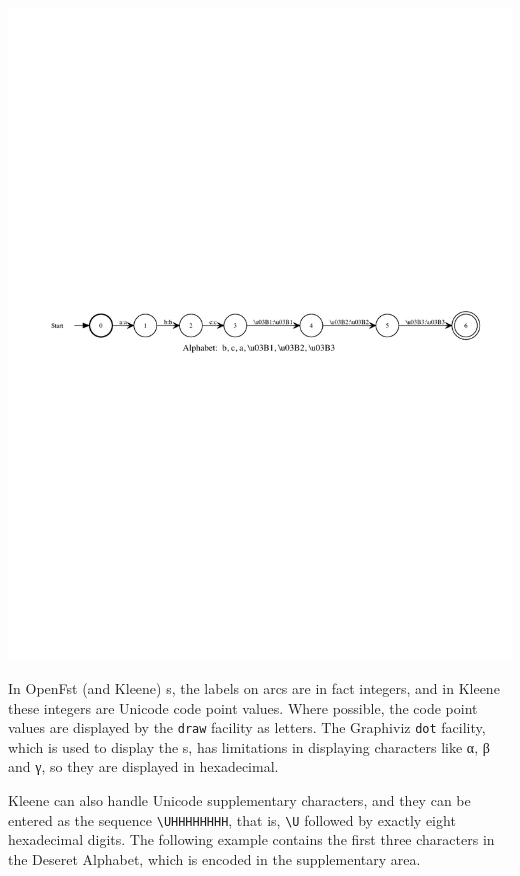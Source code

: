 \begin{center}
\includegraphics[width=135mm]{images/alphabetagamma.pdf}
\end{center}

\noindent
In OpenFst (and Kleene) \fsm{}s, the labels on arcs are in fact integers,
and in Kleene these integers are Unicode code point values.  Where possible,
the code point values are displayed by the \texttt{draw} facility as
letters.  The Graphiviz \texttt{dot}
facility, which is used to display the \fsm{}s, has limitations in displaying characters
like α, β and γ, so they are displayed in hexadecimal.  

Kleene can also handle Unicode supplementary characters, and they can be entered as the
 sequence
\verb!\UHHHHHHHH!, that is, \verb!\U! followed by exactly eight hexadecimal digits.  The following
example contains the first three characters in the Deseret Alphabet, which is encoded in
the supplementary area.


